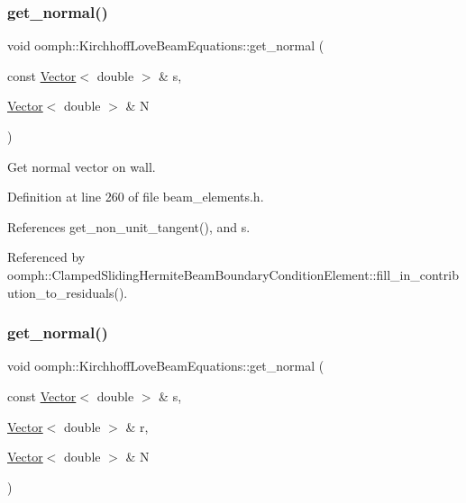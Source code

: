 \subsubsection{\texorpdfstring{get\+\_\+normal()}{get\_normal()}\hspace{0.1cm}{\footnotesize\ttfamily [1/2]}}
{\footnotesize\ttfamily void oomph\+::\+Kirchhoff\+Love\+Beam\+Equations\+::get\+\_\+normal (\begin{DoxyParamCaption}\item[{const \hyperlink{classoomph_1_1Vector}{Vector}$<$ double $>$ \&}]{s,  }\item[{\hyperlink{classoomph_1_1Vector}{Vector}$<$ double $>$ \&}]{N }\end{DoxyParamCaption})\hspace{0.3cm}{\ttfamily [inline]}}



Get normal vector on wall. 



Definition at line 260 of file beam\+\_\+elements.\+h.



References get\+\_\+non\+\_\+unit\+\_\+tangent(), and s.



Referenced by oomph\+::\+Clamped\+Sliding\+Hermite\+Beam\+Boundary\+Condition\+Element\+::fill\+\_\+in\+\_\+contribution\+\_\+to\+\_\+residuals().

\mbox{\label{classoomph_1_1KirchhoffLoveBeamEquations_a22ac8fb781bc845fa0dc3a77e1127d08}} 
\subsubsection{\texorpdfstring{get\+\_\+normal()}{get\_normal()}\hspace{0.1cm}{\footnotesize\ttfamily [2/2]}}
{\footnotesize\ttfamily void oomph\+::\+Kirchhoff\+Love\+Beam\+Equations\+::get\+\_\+normal (\begin{DoxyParamCaption}\item[{const \hyperlink{classoomph_1_1Vector}{Vector}$<$ double $>$ \&}]{s,  }\item[{\hyperlink{classoomph_1_1Vector}{Vector}$<$ double $>$ \&}]{r,  }\item[{\hyperlink{classoomph_1_1Vector}{Vector}$<$ double $>$ \&}]{N }\end{DoxyParamCaption})}



